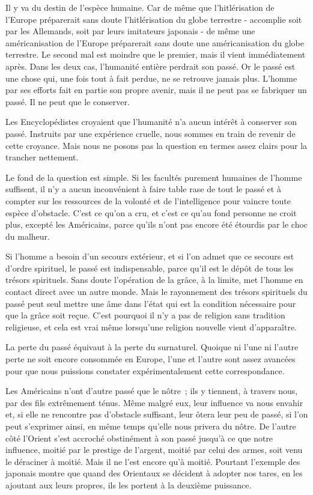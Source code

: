 \documentclass[french,twoside]{book} %
\begin{document}
Il y va du destin de l'espèce humaine. Car de même que l'hitlérisation de l'Europe préparerait sans doute l'hitlérisation du globe terrestre - accomplie soit par les Allemands, soit par leurs imitateurs japonais - de même une américanisation de l'Europe préparerait sans doute une américanisation du globe terrestre. Le second mal est moindre que le premier, mais il vient immé­diatement après. Dans les deux cas, l'humanité entière perdrait son passé. Or le passé est une chose qui, une fois tout à fait perdue, ne se retrouve jamais plus. L'homme par ses efforts fait en partie son propre avenir, mais il ne peut pas se fabriquer un passé. Il ne peut que le conserver.\par
Les Encyclopédistes croyaient que l'humanité n'a aucun intérêt à conserver son passé. Instruits par une expérience cruelle, nous sommes en train de revenir de cette croyance. Mais nous ne posons pas la question en termes assez clairs pour la trancher nettement.\par
Le fond de la question est simple. Si les facultés purement humaines de l'homme suffisent, il n'y a aucun inconvénient à faire table rase de tout le passé et à compter sur les ressources de la volonté et de l'intelligence pour vaincre toute espèce d'obstacle. C'est ce qu'on a cru, et c'est ce qu'au fond personne ne croit plus, excepté les Américains, parce qu'ils n'ont pas encore été étourdis par le choc du malheur.\par
Si l'homme a besoin d'un secours extérieur, et si l'on admet que ce secours est d'ordre spirituel, le passé est indispensable, parce qu'il est le dépôt de tous les trésors spirituels. Sans doute l'opération de la grâce, à la limite, met l'homme en contact direct avec un autre monde. Mais le rayonnement des trésors spirituels du passé peut seul mettre une âme dans l'état qui est la condition nécessaire pour que la grâce soit reçue. C'est pourquoi il n'y a pas de religion sans tradition religieuse, et cela est vrai même lorsqu'une religion nouvelle vient d'apparaître.\par
La perte du passé équivaut à la perte du surnaturel. Quoique ni l'une ni l'autre perte ne soit encore consommée en Europe, l'une et l'autre sont assez avancées pour que nous puissions constater expérimentalement cette corres­pondance.\par
Les Américains n'ont d'autre passé que le nôtre ; ils y tiennent, à travers nous, par des fils extrêmement ténus. Même malgré eux, leur influence va nous envahir et, si elle ne rencontre pas d'obstacle suffisant, leur ôtera leur peu de passé, si l'on peut s'exprimer ainsi, en même temps qu'elle nous privera du nôtre. De l'autre côté l'Orient s'est accroché obstinément à son passé jusqu'à ce que notre influence, moitié par le prestige de l'argent, moitié par celui des armes, soit venu le déraciner à moitié. Mais il ne l'est encore qu'à moitié. Pourtant l'exemple des japonais montre que quand des Orientaux se décident à adopter nos tares, en les ajoutant aux leurs propres, ils les portent à la deuxième puissance.\par
\end{document}
